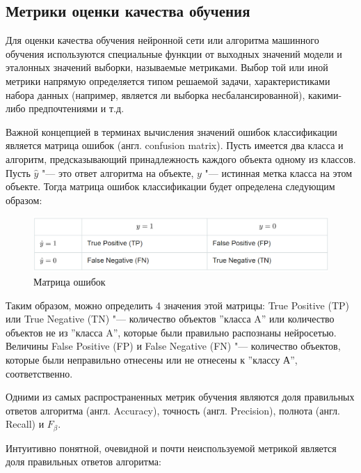 \documentclass[bachelor, och, coursework]{SCWorks}
\begin{document}
    \subsection{Метрики оценки качества обучения}

        Для оценки качества обучения нейронной сети или алгоритма машинного
        обучения используются специальные функции от выходных значений модели и
        эталонных значений выборки, называемые метриками. Выбор той или иной
        метрики напрямую определяется типом решаемой задачи, характеристиками
        набора данных (например, является ли выборка несбалансированной),
        какими-либо предпочтениями и т.д.

        Важной концепцией в терминах вычисления значений ошибок классификации
        является матрица ошибок (англ. confusion matrix). Пусть имеется два
        класса и алгоритм, предсказывающий принадлежность каждого объекта одному
        из классов. Пусть $\hat y$ "--- это ответ алгоритма на объекте, $y$ "---
        истинная метка класса на этом объекте. Тогда матрица ошибок
        классификации будет определена следующим образом:

        \begin{figure}[H]
            \centering
            \includegraphics[width=1\textwidth]{pic/matrix.png}
            \caption{Матрица ошибок}
        \end{figure}

        Таким образом, можно определить 4 значения этой матрицы: True Positive
        (TP) или True Negative (TN) "--- количество объектов ''класса A'' или
        количество объектов не из ''класса A'', которые были правильно
        распознаны нейросетью. Величины False Positive (FP) и False Negative
        (FN) "--- количество объектов, которые были неправильно отнесены или не
        отнесены к ''классу А'', соответственно.

        Одними из самых распространенных метрик обучения являются доля
        правильных ответов алгоритма (англ. Accuracy), точность (англ.
        Precision), полнота (англ. Recall) и $F_\beta$.

        Интуитивно понятной, очевидной и почти неиспользуемой метрикой является
        доля правильных ответов алгоритма:
\end{document}
